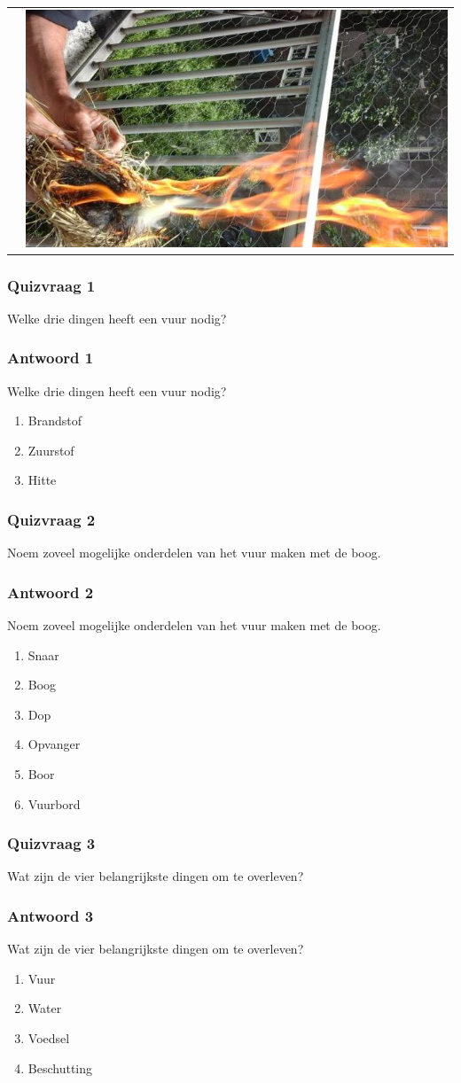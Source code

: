 \documentclass[a4paper, handout]{beamer}
\begin{document}
\begin{frame}
\begin{tabular}{ c c }
		&
		\includegraphics[scale=0.2]{blazen-4}
		\\
	\end{tabular}
\end{frame}

\begin{frame}
	\frametitle{Quizvraag 1}
	Welke drie dingen heeft een vuur nodig?
\end{frame}

\begin{frame}
	\frametitle{Antwoord 1}
	Welke drie dingen heeft een vuur nodig?
	\begin{enumerate}
		\item{Brandstof}
		\item{Zuurstof}
		\item{Hitte}
	\end{enumerate}
\end{frame}
\begin{frame}
	\frametitle{Quizvraag 2}
	Noem zoveel mogelijke onderdelen van het vuur maken met de boog.
\end{frame}

\begin{frame}
	\frametitle{Antwoord 2}
	Noem zoveel mogelijke onderdelen van het vuur maken met de boog.
	\begin{enumerate}
		\item{Snaar}
		\item{Boog}
		\item{Dop}
		\item{Opvanger}
		\item{Boor}
		\item{Vuurbord}
	\end{enumerate}
\end{frame}

\begin{frame}
	\frametitle{Quizvraag 3}
	Wat zijn de vier belangrijkste dingen om te overleven?
\end{frame}

\begin{frame}
	\frametitle{Antwoord 3}
	Wat zijn de vier belangrijkste dingen om te overleven?
	\begin{enumerate}
		\item{Vuur}
		\item{Water}
		\item{Voedsel}
		\item{Beschutting}
	\end{enumerate}
\end{frame}
\end{document}
